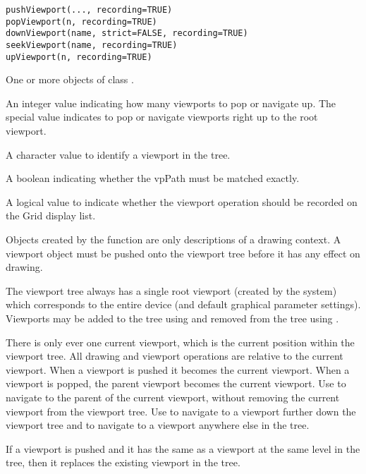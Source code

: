 %
\begin{Usage}
\begin{verbatim}
pushViewport(..., recording=TRUE)
popViewport(n, recording=TRUE)
downViewport(name, strict=FALSE, recording=TRUE)
seekViewport(name, recording=TRUE)
upViewport(n, recording=TRUE)
\end{verbatim}
\end{Usage}
%
\begin{Arguments}
\begin{ldescription}
\item[\code{...}] One or more objects of class .
\item[\code{n}] An integer value indicating how many viewports to
pop or navigate up.  The special value  indicates to
pop or navigate viewports right up to the root viewport.
\item[\code{name}] A character value to identify a viewport in the tree.
\item[\code{strict}]  A boolean indicating whether the vpPath must be
matched exactly. 
\item[\code{recording}] A logical value to indicate whether the viewport
operation should be recorded on the Grid display list.
\end{ldescription}
\end{Arguments}
%
\begin{Details}\relax
Objects created by the  function are only
descriptions
of a drawing context.  A viewport object must be pushed onto the
viewport tree before it has any effect on drawing.

The viewport tree always has a single root viewport (created by the
system) which corresponds to the entire device (and default
graphical parameter settings).  Viewports may be added to the tree
using  and removed from the tree using
.  

There is only ever one current viewport, which is the current
position within the viewport tree.  All drawing and
viewport operations are relative to the current viewport.
When a viewport is pushed it becomes the current viewport.
When a viewport is popped, the parent viewport becomes
the current viewport.  Use  to navigate to the parent
of the current viewport, without removing the current viewport
from the viewport tree.  Use  to navigate to
a viewport further down the viewport tree and 
to navigate to a viewport anywhere else in the tree.

If a viewport is pushed and it has the same  as a
viewport at the same level in the tree, then it replaces the
existing viewport in the tree.
\end{Details}
